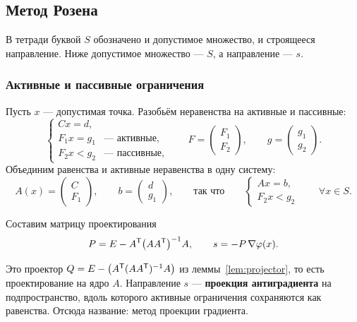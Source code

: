 \subsection{Метод Розена}
\label{subsec:rosen}

\begin{idea}[title={Обозначения}]
В тетради буквой $S$ обозначено и допустимое множество, и строящееся
направление. Ниже допустимое множество — $S$, а направление — $s$.
\end{idea}

\subsubsection*{Активные и пассивные ограничения}

Пусть $x$ — допустимая точка. Разобьём неравенства на активные и пассивные:
\[
  \begin{cases}
    Cx = d , \\
    F_1 x = g_1 & \text{— активные,} \\
    F_2 x < g_2 & \text{— пассивные,}
  \end{cases}
  \qquad
  F = \begin{pmatrix} F_1 \\ \hline F_2 \end{pmatrix} ,
  \qquad
  g = \begin{pmatrix} g_1 \\ \hline g_2 \end{pmatrix} .
\]
Объединим равенства и активные неравенства в одну систему:
\[
  A(x) = \begin{pmatrix} C \\ \hline F_1 \end{pmatrix} ,
  \qquad
  b = \begin{pmatrix} d \\ \hline g_1 \end{pmatrix} ,
  \qquad\text{так что}\qquad
  \begin{cases}
    A x = b , \\
    F_2 x < g_2
  \end{cases}
  \qquad \forall x \in S .
  \tag{1}\label{eq:rosen-1}
\]

Составим матрицу проектирования
\[
  P = E - A^{\mathsf{T}} \big(A A^{\mathsf{T}}\big)^{-1} A ,
  \qquad
  s = -P\, \nabla\varphi(x) .
\]

\begin{idea}
Это проектор $Q = E - \big(A^{\mathsf{T}}(AA^{\mathsf{T}})^{-1}A\big)$ из леммы~\ref{lem:projector},
то есть проектирование на ядро $A$. Направление $s$ — \textbf{проекция
антиградиента} на подпространство, вдоль которого активные ограничения
сохраняются как равенства. Отсюда название: метод проекции градиента.
\end{idea}

